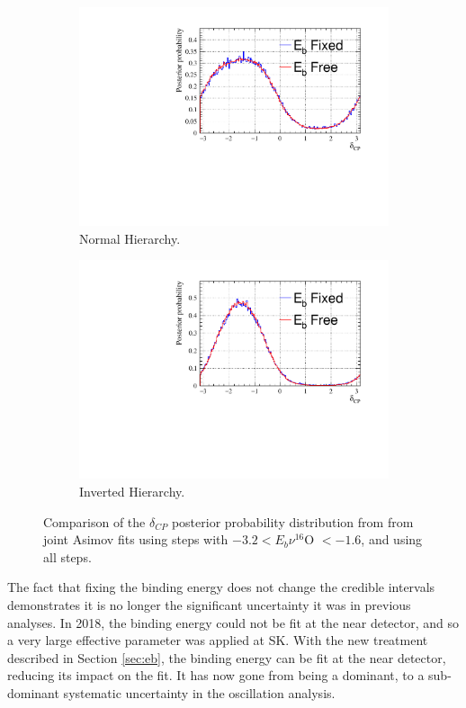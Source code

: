 \begin{figure}[!htbp]
\centering
\begin{subfigure}{.7\textwidth}
  \centering
  \includegraphics[width=0.95\linewidth]{figs/compMaCh3Contours_EB_asimov/compMaCh3Contours_EB_dcp_asimovA_NH}
  \caption{Normal Hierarchy.}
  \label{fig:EBdcpNH}
\end{subfigure}
\begin{subfigure}{.7\textwidth}
  \centering
  \includegraphics[width=0.95\linewidth]{figs/compMaCh3Contours_EB_asimov/compMaCh3Contours_EB_dcp_asimovA_IH}
  \caption{Inverted Hierarchy.}
  \label{fig:EBdcpIH}
\end{subfigure}
\caption{Comparison of the $\delta_{CP}$ posterior probability distribution from from joint Asimov fits using steps with $ -3.2 < E_b \nu ^{16}$O $< -1.6$, and using all steps.}
\label{fig:EBdcp}
\end{figure}

The fact that fixing the binding energy does not change the credible intervals demonstrates it is no longer the significant uncertainty it was in previous analyses. In 2018, the binding energy could not be fit at the near detector, and so a very large effective parameter was applied at SK. With the new treatment described in Section \ref{sec:eb}, the binding energy can be fit at the near detector, reducing its impact on the fit. It has now gone from being a dominant, to a sub-dominant systematic uncertainty in the oscillation analysis.

\newpage
